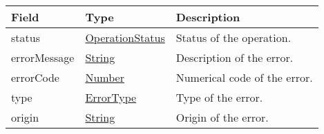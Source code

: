 \documentclass[a4paper]{arrowhead}
\newcommand{\pref}[1]{{\textcolor{ArrowheadGrey}{\hyperref[sec:model:primitives:#1]{#1}}}}
\begin{document}

\begin{table}[ht!]
\begin{tabularx}{\textwidth}{| p{4.25cm} | p{3.5cm} | X |} \hline
\rowcolor{gray!33} Field & Type      & Description \\ \hline
status & \pref{OperationStatus} & Status of the operation. \\ \hline
errorMessage & \pref{String} & Description of the error. \\ \hline
errorCode &\pref{Number}  & Numerical code of the error. \\ \hline
type & \pref{ErrorType} & Type of the error. \\ \hline
origin & \pref{String} & Origin of the error. \\ \hline
\end{tabularx}
\end{table}

\clearpage

\end{document}
